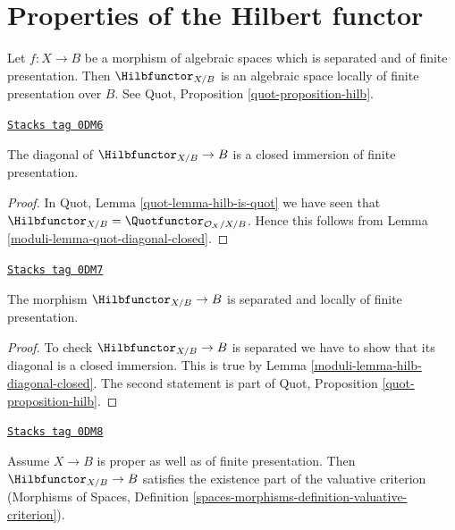 \section{Properties of the Hilbert functor}
\label{moduli-section-hilb}
Let $f : X \to B$ be a morphism of algebraic spaces which is
separated and of finite presentation. Then
$\Hilbfunctor_{X/B}$ is an algebraic space locally of finite
presentation over $B$. See Quot, Proposition \ref{quot-proposition-hilb}.

\begin{lemma}
\label{moduli-lemma-hilb-diagonal-closed}
\href{https://stacks.math.columbia.edu/tag/0DM6}{\texttt{Stacks tag 0DM6}}

The diagonal of $\Hilbfunctor_{X/B} \to B$ is a closed immersion
of finite presentation.
\end{lemma}

\begin{proof}

In Quot, Lemma \ref{quot-lemma-hilb-is-quot} we have seen that
$\Hilbfunctor_{X/B} = \Quotfunctor_{\mathcal{O}_X/X/B}$.
Hence this follows from Lemma \ref{moduli-lemma-quot-diagonal-closed}.
\end{proof}

\begin{lemma}
\label{moduli-lemma-hilb-s-lfp}
\href{https://stacks.math.columbia.edu/tag/0DM7}{\texttt{Stacks tag 0DM7}}

The morphism $\Hilbfunctor_{X/B} \to B$ is separated
and locally of finite presentation.
\end{lemma}

\begin{proof}

To check $\Hilbfunctor_{X/B} \to B$ is separated we have to
show that its diagonal is a closed immersion. This
is true by Lemma \ref{moduli-lemma-hilb-diagonal-closed}.
The second statement is part of
Quot, Proposition \ref{quot-proposition-hilb}.
\end{proof}

\begin{lemma}
\label{moduli-lemma-hilb-existence-part}
\href{https://stacks.math.columbia.edu/tag/0DM8}{\texttt{Stacks tag 0DM8}}

Assume $X \to B$ is proper as well as of finite presentation.
Then $\Hilbfunctor_{X/B} \to B$ satisfies the existence part
of the valuative criterion (Morphisms of Spaces, Definition
\ref{spaces-morphisms-definition-valuative-criterion}).
\end{lemma}

